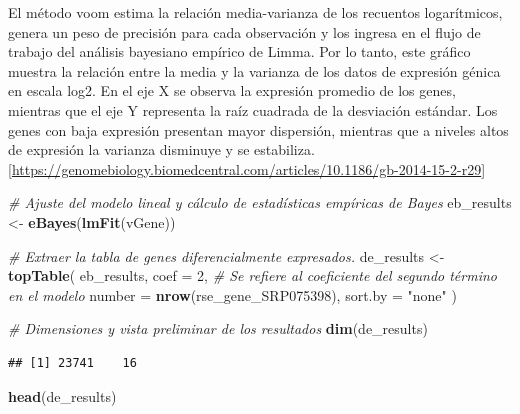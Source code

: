 \documentclass[
]{article}
\newenvironment{Shaded}{\begin{snugshade}}{\end{snugshade}}
\newcommand{\AttributeTok}[1]{\textcolor[rgb]{0.13,0.29,0.53}{#1}}
\newcommand{\CommentTok}[1]{\textcolor[rgb]{0.56,0.35,0.01}{\textit{#1}}}
\newcommand{\DecValTok}[1]{\textcolor[rgb]{0.00,0.00,0.81}{#1}}
\newcommand{\FunctionTok}[1]{\textcolor[rgb]{0.13,0.29,0.53}{\textbf{#1}}}
\newcommand{\NormalTok}[1]{#1}
\newcommand{\OtherTok}[1]{\textcolor[rgb]{0.56,0.35,0.01}{#1}}
\newcommand{\StringTok}[1]{\textcolor[rgb]{0.31,0.60,0.02}{#1}}
\begin{document}
El método voom estima la relación media-varianza de los recuentos
logarítmicos, genera un peso de precisión para cada observación y los
ingresa en el flujo de trabajo del análisis bayesiano empírico de Limma.
Por lo tanto, este gráfico muestra la relación entre la media y la
varianza de los datos de expresión génica en escala log2. En el eje X se
observa la expresión promedio de los genes, mientras que el eje Y
representa la raíz cuadrada de la desviación estándar. Los genes con
baja expresión presentan mayor dispersión, mientras que a niveles altos
de expresión la varianza disminuye y se estabiliza.
{[}\url{https://genomebiology.biomedcentral.com/articles/10.1186/gb-2014-15-2-r29}{]}

\begin{Shaded}
\begin{Highlighting}[]
\CommentTok{\# Ajuste del modelo lineal y cálculo de estadísticas empíricas de Bayes}
\NormalTok{eb\_results }\OtherTok{\textless{}{-}} \FunctionTok{eBayes}\NormalTok{(}\FunctionTok{lmFit}\NormalTok{(vGene))}


\CommentTok{\# Extraer la tabla de genes diferencialmente expresados.}
\NormalTok{de\_results }\OtherTok{\textless{}{-}} \FunctionTok{topTable}\NormalTok{(}
\NormalTok{    eb\_results,}
    \AttributeTok{coef =} \DecValTok{2}\NormalTok{, }\CommentTok{\# Se refiere al coeficiente del segundo término en el modelo}
    \AttributeTok{number =} \FunctionTok{nrow}\NormalTok{(rse\_gene\_SRP075398),}
    \AttributeTok{sort.by =} \StringTok{"none"}
\NormalTok{)}

\CommentTok{\# Dimensiones y vista preliminar de los resultados}
\FunctionTok{dim}\NormalTok{(de\_results)}
\end{Highlighting}
\end{Shaded}

\begin{verbatim}
## [1] 23741    16
\end{verbatim}

\begin{Shaded}
\begin{Highlighting}[]
\FunctionTok{head}\NormalTok{(de\_results)}
\end{Highlighting}
\end{Shaded}
\end{document}
